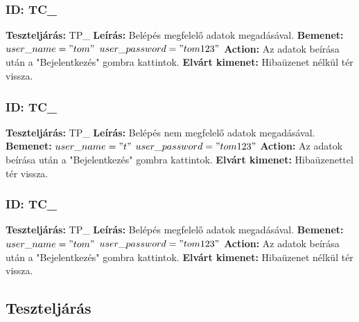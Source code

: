 \documentclass[12pt]{report}
\theoremstyle{definition}
\begin{document}
	\subsubsection{ID: TC\_}\addtocounter{TC}{1}
	\textbf{Teszteljárás:} TP\_
	\newline 
	\textbf{Leírás:} Belépés megfelelő adatok megadásával.
	\newline 
	\textbf{Bemenet:} $user\_name = "tom"$ $user\_password = "tom123"$
	\newline 
	\textbf{Action:} Az adatok beírása után a "Bejelentkezés" gombra kattintok.
	\newline 
	\textbf{Elvárt kimenet:} Hibaüzenet nélkül tér vissza.
	
	\subsubsection{ID: TC\_}\addtocounter{TC}{1}
	\textbf{Teszteljárás:} TP\_
	\newline 
	\textbf{Leírás:} Belépés nem megfelelő adatok megadásával.
	\newline 
	\textbf{Bemenet:} $user\_name = "t"$ $user\_password = "tom123"$
	\newline 
	\textbf{Action:} Az adatok beírása után a "Bejelentkezés" gombra kattintok.
	\newline 
	\textbf{Elvárt kimenet:} Hibaüzenettel tér vissza.
	
	\subsubsection{ID: TC\_}\addtocounter{TC}{1}
	\textbf{Teszteljárás:} TP\_
	\newline 
	\textbf{Leírás:} Belépés megfelelő adatok megadásával.
	\newline 
	\textbf{Bemenet:} $user\_name = "tom"$ $user\_password = "tom123"$
	\newline 
	\textbf{Action:} Az adatok beírása után a "Bejelentkezés" gombra kattintok.
	\newline 
	\textbf{Elvárt kimenet:} Hibaüzenet nélkül tér vissza.
	
	\setcounter{TPTCStop}{\value{TC}}
	\subsection{Teszteljárás}
	
\end{document}
